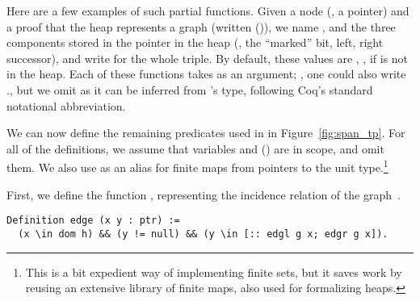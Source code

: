 Here are a few examples of such partial functions. Given a node (\ie,
a pointer)  and a proof that the heap  represents a
graph (written ()), we name ,
 and  the three components stored in the
pointer  in the heap (\ie, the ``marked'' bit, left, right
successor), and write  for the whole triple.  By
default, these values are , ,  if
 is not in the heap.
%
Each of these functions takes  as an argument; \ie, one could
also write  \etc., but we omit  as it can be
inferred from 's type, following Coq's standard notational
abbreviation.

We can now define the remaining predicates used in  in
Figure~\ref{fig:span_tp}. For all of the definitions, we assume that variables
 and () are in scope, and omit them. We also use
 as an alias for finite maps from pointers to the unit
type.\footnote{This is a bit expedient way of implementing finite
  sets, but it saves work by reusing an extensive library of finite
  maps, also used for formalizing heaps.}

First, we define the function , representing the incidence
relation of the graph~.

\begin{lstlisting}
Definition edge (x y : ptr) := 
  (x \in dom h) && (y != null) && (y \in [:: edgl g x; edgr g x]).
\end{lstlisting}

